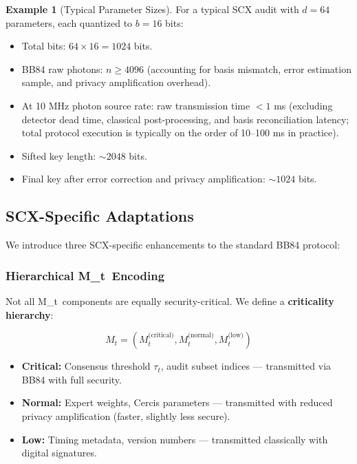 \documentclass[11pt,a4paper]{article}
\theoremstyle{plain}
\theoremstyle{definition}
\newtheorem{example}[theorem]{Example}
\theoremstyle{remark}
\newcommand{\Mt}{M_t}
\begin{document}
\begin{example}[Typical Parameter Sizes]
For a typical SCX audit with $d = 64$ parameters, each quantized to
$b = 16$ bits:
\begin{itemize}
  \item Total bits: $64 \times 16 = 1024$ bits.
  \item BB84 raw photons: $n \geq 4096$ (accounting for basis mismatch,
        error estimation sample, and privacy amplification overhead).
  \item At 10 MHz photon source rate: raw transmission time $< 1$ ms
        (excluding detector dead time, classical post-processing, and
        basis reconciliation latency; total protocol execution is
        typically on the order of 10--100 ms in practice).
  \item Sifted key length: $\sim 2048$ bits.
  \item Final key after error correction and privacy amplification: $\sim 1024$ bits.
\end{itemize}
\end{example}

\subsection{SCX-Specific Adaptations}
\label{sec:bb84_scx}

We introduce three SCX-specific enhancements to the standard BB84 protocol:

\subsubsection{Hierarchical \Mt\ Encoding}

Not all \Mt\ components are equally security-critical. We define a
\textbf{criticality hierarchy}:

\[
\Mt = (\Mt^{\text{(critical)}}, \Mt^{\text{(normal)}}, \Mt^{\text{(low)}})
\]

\begin{itemize}
  \item \textbf{Critical:} Consensus threshold $\tau_t$, audit subset indices
        — transmitted via BB84 with full security.
  \item \textbf{Normal:} Expert weights, Cercis parameters — transmitted
        with reduced privacy amplification (faster, slightly less secure).
  \item \textbf{Low:} Timing metadata, version numbers — transmitted
        classically with digital signatures.
\end{itemize}
\end{document}
